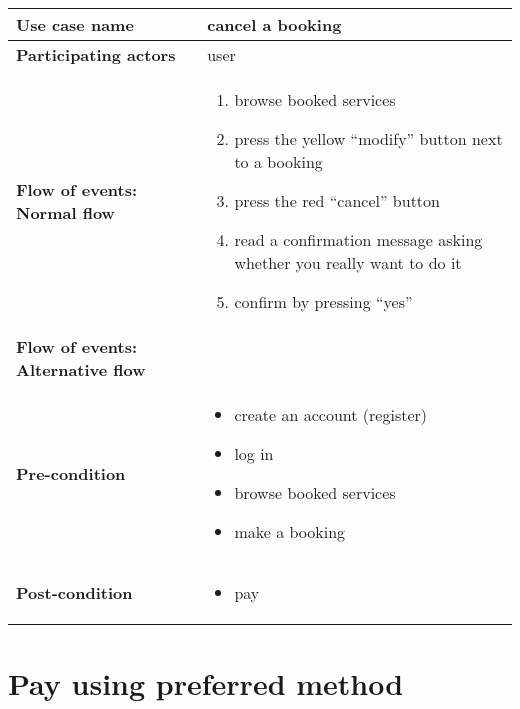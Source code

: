 \documentclass[a4paper, 13pt, draft]{report}
\begin{document}
\begin{center}
    \begin{tabular}{| >{\bf}l | p{5.55cm} |} 
	\hline
	Use case name & cancel a booking \\ 
	\hline
	Participating actors & user \\
	\hline
	Flow of events: Normal flow & 
	\begin{enumerate}		
	    \item browse booked services
	    \item press the yellow ``modify'' button next to a booking
	    \item press the red ``cancel'' button
	    \item read a confirmation message asking whether you really want to do it
	    \item confirm by pressing ``yes''
	\end{enumerate}	\\
	\hline
	Flow of events: Alternative flow & \notapplicable \\
	\hline
	Pre-condition & 
	\begin{itemize} 
	    \item create an account (register)
	    \item log in
	    \item browse booked services
	    \item make a booking
	\end{itemize} \\
	\hline
	Post-condition & 
	\begin{itemize} 
	    \item pay
	\end{itemize} \\
	\hline
    \end{tabular}
\end{center}

\section*{Pay using preferred method}
\end{document}
